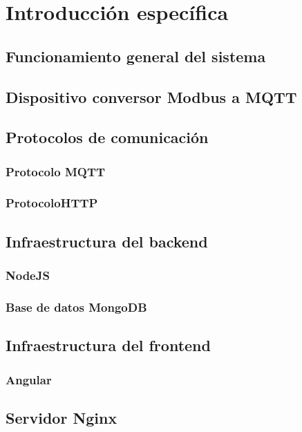 \chapter{Introducción específica} %

\label{Chapter2}



\section{Funcionamiento general del sistema}
\label{sec:ejemplo}

\section{Dispositivo conversor Modbus a MQTT}

\section{Protocolos de comunicación}

\subsection{Protocolo MQTT}

\subsection{ProtocoloHTTP}

\section{Infraestructura del backend}

\subsection{NodeJS}

\subsection{Base de datos MongoDB}

\section{Infraestructura del frontend}

\subsection{Angular}

\section{Servidor Nginx}